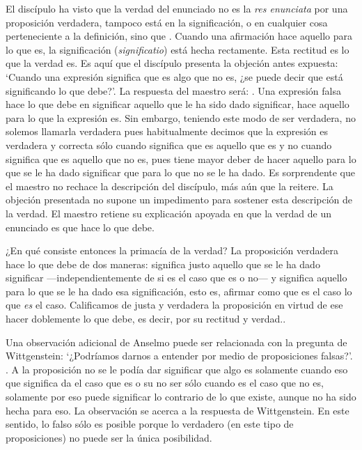 El discípulo ha visto que la verdad del enunciado no es la \emph{res enunciata}
por una proposición verdadera, tampoco está en la significación, o en cualquier
cosa perteneciente a la definición, sino que \autocite[492]{anselm1952obras:deveritate}. Cuando una afirmación hace
aquello para lo que es, la significación (\emph{significatio}) está hecha
rectamente. Esta rectitud es lo que la verdad es. Es aquí que el discípulo
presenta la objeción antes expuesta: `Cuando una expresión significa que es algo
que no es, ¿se puede decir que está significando lo que debe?'. La respuesta del
maestro será: \autocite[494]{anselm1952obras:deveritate}. Una expresión falsa
hace lo que debe en significar aquello que le ha sido dado significar, hace
aquello para lo que la expresión es. Sin embargo, teniendo este modo de ser
verdadera, no solemos llamarla verdadera pues habitualmente decimos que la
expresión es verdadera y correcta sólo cuando significa que es aquello que es y
no cuando significa que es aquello que no es, pues tiene mayor deber de hacer
aquello para lo que se le ha dado significar que para lo que no se le ha dado.
Es sorprendente que el maestro no rechace la descripción del discípulo, más aún
que la reitere. La objeción presentada no supone un impedimento para sostener
esta descripción de la verdad. El maestro retiene su explicación apoyada en que
la verdad de un enunciado es que hace lo que
debe\autocite[Cf.~][76]{anscombe2011plato:truth}.

¿En qué consiste entonces la primacía de la verdad? La proposición verdadera
hace lo que debe de dos maneras: significa justo aquello que se le ha dado
significar ---independientemente de si es el caso que es o no--- y significa
aquello para lo que se le ha dado esa significación, esto es, afirmar como que
es el caso lo que \emph{es} el caso. Calificamos de justa y verdadera la
proposición en virtud de ese hacer doblemente lo que debe, es decir, por su
rectitud y verdad.\autocite[Cf.~][497]{anselm1952obras:deveritate}.

Una observación adicional de Anselmo puede ser relacionada con la pregunta de
Wittgenstein: `¿Podríamos darnos a entender por medio de proposiciones falsas?'.
\autocite[497]{anselm1952obras:deveritate}. A la
proposición no se le podía dar significar que algo es solamente cuando eso que
significa da el caso que es o su no ser sólo cuando es el caso que no es,
solamente por eso puede significar lo contrario de lo que existe, aunque no ha
sido hecha para eso\autocite[Cf~.][76]{anscombe2011plato:truth}. La observación
se acerca a la respuesta de Wittgenstein. En este sentido, lo falso sólo es
posible porque lo verdadero (en este tipo de proposiciones) no puede ser la
única posibilidad.

